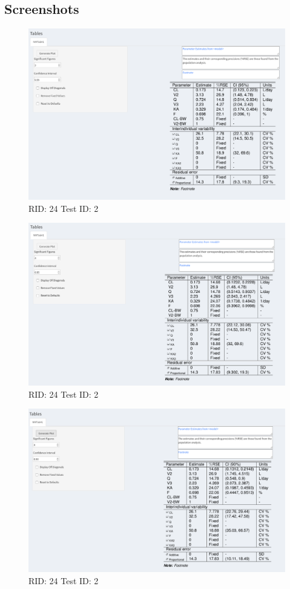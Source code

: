 \documentclass{article}
\begin{document}
\subsection*{Screenshots}

\begin{figure}[H]
\includegraphics[width=.8\textwidth]{screencaps/24-2-1.png}
\caption{RID: 24 Test ID: 2}
\end{figure}

\begin{figure}[H]
\includegraphics[width=.8\textwidth]{screencaps/24-2-2.png}
\caption{RID: 24 Test ID: 2}
\end{figure}


\begin{figure}[H]
\includegraphics[width=.8\textwidth]{screencaps/24-2-3.png}
\caption{RID: 24 Test ID: 2}
\end{figure}
\end{document}
